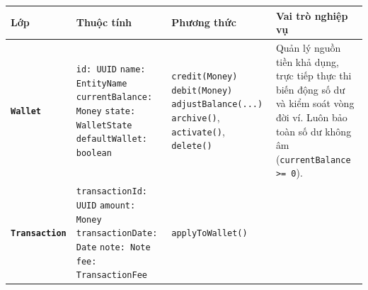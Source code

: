 \documentclass[a4paper,12pt]{report}
\newcounter{none}
\begin{document}
{\def\LTcaptype{none} %
\begingroup
\renewcommand{\arraystretch}{1.25}
\fontsize{9pt}{12pt}\selectfont
\begin{longtable}[]{@{}
  >{\raggedright\arraybackslash}p{}
  >{\raggedright\arraybackslash}p{}
  >{\raggedright\arraybackslash}p{}
  >{\raggedright\arraybackslash}p{}@{}}
\toprule\noalign{}
\begin{minipage}[b]{\linewidth}\raggedright
\textbf{Lớp}
\end{minipage} & \begin{minipage}[b]{\linewidth}\raggedright
\textbf{Thuộc tính}
\end{minipage} & \begin{minipage}[b]{\linewidth}\raggedright
\textbf{Phương thức}
\end{minipage} & \begin{minipage}[b]{\linewidth}\raggedright
\textbf{Vai trò nghiệp vụ}
\end{minipage} \\
\midrule\noalign{}
\endhead
\bottomrule\noalign{}
\endlastfoot
\textbf{\texttt{Wallet}} &
\texttt{id: UUID}\newline
\texttt{name: EntityName}\newline
\texttt{currentBalance: Money}\newline
\texttt{state: WalletState}\newline
\texttt{defaultWallet: boolean} &
\texttt{credit(Money)}\newline
\texttt{debit(Money)}\newline
\texttt{adjustBalance(...)}\newline
\texttt{archive()}, \texttt{activate()},\newline
\texttt{delete()} &
Quản lý nguồn tiền khả dụng, trực tiếp thực thi biến động số dư và kiểm soát vòng đời ví. Luôn bảo toàn số dư không âm (\texttt{currentBalance >= 0}). \\
\midrule\noalign{}
\textbf{\texttt{Transaction}} &
\texttt{transactionId: UUID}\newline
\texttt{amount: Money}\newline
\texttt{transactionDate: Date}\newline
\texttt{note: Note}\newline
\texttt{fee: TransactionFee} &
\texttt{applyToWallet()}\newline

\end{longtable}}
\end{document}
